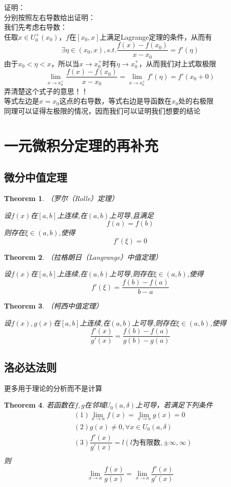 \documentclass[11pt,hyperref,a4paper,UTF8]{ctexart}
\newtheorem{theorem}{Theorem}[subsection]
\begin{document}
\begin{CJK}{UTF8}{gkai}
证明：\\
分别按照左右导数给出证明：\\
我们先考虑右导数：\\
任取$x\in U_0^{+}(x_0)$，$f$在$[x_0,x]$上满足Lagrange定理的条件，从而有
\[\exists \eta \in (x_0,x),s.t.\dfrac{f(x)-f(x_0)}{x-x_0}=f'(\eta)\]
由于$x_0 < \eta < x$，所以当$x\to x_0^+ $时有$\eta \to x_0^+$，从而我们对上式取极限
\[\lim_{x\to x_0^+}\dfrac{f(x)-f(x_0)}{x-x_0} = \lim_{x\to x_0^+} f'(\eta)= f'(x_0+0)\]
弄清楚这个式子的意思！！\\
等式左边是$x=x_0$这点的右导数，等式右边是导函数在$x_0$处的右极限\\
同理可以证得左极限的情况，因而我们可以证明我们想要的结论\\

\section{一元微积分定理的再补充}
\subsection{微分中值定理}
\begin{theorem}（罗尔（Rolle）定理）

  设$f(x)$在$[a,b]$上连续,在$(a,b)$上可导,且满足
  \[f(a) = f(b)\]
  则存在$\xi\in(a,b)$,使得
  \[f'(\xi) = 0\]
\end{theorem}

\begin{theorem}（拉格朗日（Langrange）中值定理）
    
  设$f(x)$在$[a,b]$上连续,在$(a,b)$上可导,则存在$\xi\in(a,b)$,使得
  \[f'(\xi) = \dfrac{f(b)-f(a)}{b-a}\]

\end{theorem}

\begin{theorem}（柯西中值定理）
        
  设$f(x),g(x)$在$[a,b]$上连续,在$(a,b)$上可导,则存在$\xi\in(a,b)$,使得
  \[\dfrac{f'(x)}{g'(x)} = \dfrac{f(b)-f(a)}{g(b)-g(a)}\]

\end{theorem}

\subsection{洛必达法则}
更多用于理论的分析而不是计算\\
\begin{theorem}
若函数在$f,g$在邻域$U_0(a,\delta)$上可导，若满足下列条件
\[
\begin{aligned}
&(1)\lim_{x\to a}f(x) =\lim_{x\to a } g(x) = 0\\
&(2)g(x) \neq 0 ,\forall x\in U_0(a,\delta)\\
&(3)\dfrac{f'(x)}{g'(x)} = l(l\text{为有限数},\pm\infty,\infty)\\
\end{aligned}
\]
则
\[\lim_{x\to a}\dfrac{f(x)}{g(x)}=\lim_{x\to a}\dfrac{f'(x)}{g'(x)}\]
\end{theorem}


\end{CJK}
\end{document}
